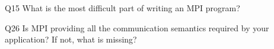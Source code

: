 \begin{description}%
\item{Q15} What is the most difficult part of writing an MPI program?%
\item{Q26} Is MPI providing all the communication semantics required by your application? If not, what is missing?%
\end{description}%
